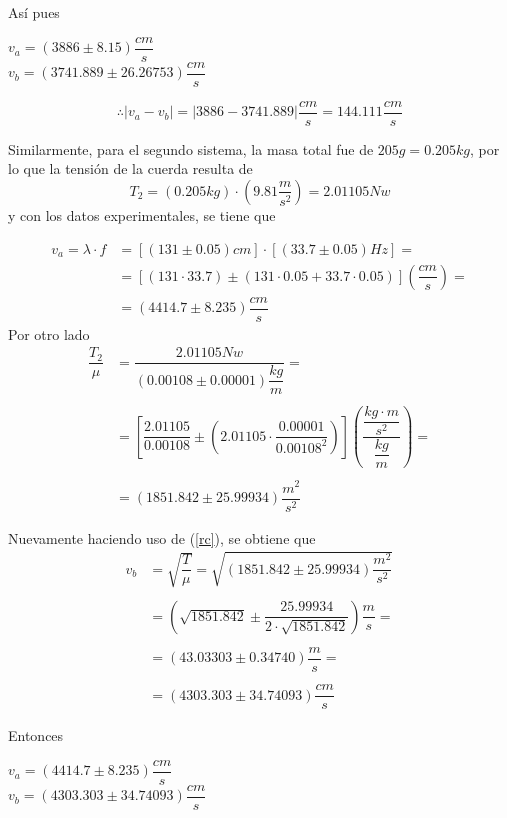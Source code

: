 \documentclass[10pt,a4paper]{article}
\begin{document}
 	Así pues
 	\begin{center}
 		\begin{multicols}{2}
	 		$ v_a=(3886\pm8.15)\dfrac{cm}{s} $\\
	 		$ v_b=(3741.889\pm 26.26753)\dfrac{cm}{s} $
	 	\end{multicols}
 	\end{center}
 	
 	$$\therefore |v_a-v_b|=\left|3886-3741.889\right|\frac{cm}{s}=144.111\frac{cm}{s}$$
 	
 	Similarmente, para el segundo sistema, la masa total fue de $ 205g=0.205kg $, por lo que la tensión de la cuerda resulta de
 	$$T_2=(0.205 kg)\cdot \left(9.81\frac{m}{s^2}\right)=2.01105 Nw$$ 
 	y con los datos experimentales, se tiene que
 	
 	\begin{align*}
 		v_a=\lambda\cdot f&=[(131\pm0.05)cm]\cdot[(33.7\pm 0.05)Hz]=\\
 		&=[(131\cdot33.7)\pm(131\cdot0.05+ 33.7\cdot0.05)]\left(\dfrac{cm}{s}\right)=\\
 		&=(4414.7\pm8.235)\dfrac{cm}{s}
 	\end{align*}
 	Por otro lado
 	\begin{align*}
 		\dfrac{T_2}{\mu}&=\dfrac{2.01105 Nw}{(0.00108\pm 0.00001)\dfrac{kg}{m}}=\\\\
 		&=\left[\dfrac{2.01105}{0.00108}\pm\left(2.01105\cdot\dfrac{0.00001}{0.00108^2}\right)\right]\left(\dfrac{\dfrac{kg\cdot m}{s^2}}{\dfrac{kg}{m}}\right)=\\\\
 		&=(1851.842\pm25.99934)\dfrac{m^2}{s^2}
 	\end{align*}
 	
 	Nuevamente haciendo uso de (\ref{rc}), se obtiene que
 	\begin{align*}
 		v_b&=\sqrt{\dfrac{T}{\mu}}=\sqrt{(1851.842\pm25.99934)\dfrac{m^2}{s^2}}\\\\
 		&=\left(\sqrt{1851.842}\pm\dfrac{25.99934}{2\cdot\sqrt{1851.842}}\right)\dfrac{m}{s}=\\\\
 		&=(43.03303\pm 0.34740)\dfrac{m}{s}=\\\\
 		&=(4303.303\pm 34.74093)\dfrac{cm}{s}
 	\end{align*}
 	
 	Entonces
 	\begin{center}
 		\begin{multicols}{2}
 			$ v_a=(4414.7\pm8.235)\dfrac{cm}{s} $\\
 			$ v_b=(4303.303\pm 34.74093)\dfrac{cm}{s} $
 		\end{multicols}
 	\end{center}
 	
\end{document}
